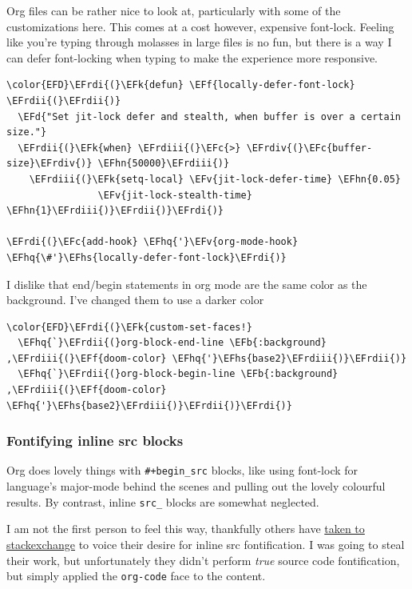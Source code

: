 \documentclass{scrartcl}
\newcommand{\EFk}[1]{\textcolor{EFk}{#1}} %
\newcommand{\EFd}[1]{\textcolor{EFd}{#1}} %
\newcommand{\EFb}[1]{\textcolor{EFb}{#1}} %
\newcommand{\EFc}[1]{\textcolor{EFc}{#1}} %
\newcommand{\EFv}[1]{\textcolor{EFv}{#1}} %
\newcommand{\EFf}[1]{\textcolor{EFf}{#1}} %
\newcommand{\EFhn}[1]{#1} %
\newcommand{\EFhq}[1]{#1} %
\newcommand{\EFhs}[1]{#1} %
\newcommand{\EFrdi}[1]{#1} %
\newcommand{\EFrdii}[1]{#1} %
\newcommand{\EFrdiii}[1]{#1} %
\newcommand{\EFrdiv}[1]{#1} %
\begin{document}
Org files can be rather nice to look at, particularly with some of the
customizations here. This comes at a cost however, expensive font-lock.
Feeling like you're typing through molasses in large files is no fun, but there
is a way I can defer font-locking when typing to make the experience more
responsive.
\begin{Code}
\begin{Verbatim}[]
\color{EFD}\EFrdi{(}\EFk{defun} \EFf{locally-defer-font-lock} \EFrdii{(}\EFrdii{)}
  \EFd{"Set jit-lock defer and stealth, when buffer is over a certain size."}
  \EFrdii{(}\EFk{when} \EFrdiii{(}\EFc{>} \EFrdiv{(}\EFc{buffer-size}\EFrdiv{)} \EFhn{50000}\EFrdiii{)}
    \EFrdiii{(}\EFk{setq-local} \EFv{jit-lock-defer-time} \EFhn{0.05}
                \EFv{jit-lock-stealth-time} \EFhn{1}\EFrdiii{)}\EFrdii{)}\EFrdi{)}

\EFrdi{(}\EFc{add-hook} \EFhq{'}\EFv{org-mode-hook} \EFhq{\#'}\EFhs{locally-defer-font-lock}\EFrdi{)}
\end{Verbatim}
\end{Code}

I dislike that end/begin statements in org mode are the same color as the
background. I've changed them to use a darker color
\begin{Code}
\begin{Verbatim}[]
\color{EFD}\EFrdi{(}\EFk{custom-set-faces!}
  \EFhq{`}\EFrdii{(}org-block-end-line \EFb{:background} ,\EFrdiii{(}\EFf{doom-color} \EFhq{'}\EFhs{base2}\EFrdiii{)}\EFrdii{)}
  \EFhq{`}\EFrdii{(}org-block-begin-line \EFb{:background} ,\EFrdiii{(}\EFf{doom-color} \EFhq{'}\EFhs{base2}\EFrdiii{)}\EFrdii{)}\EFrdi{)}
\end{Verbatim}
\end{Code}

\subsubsection{Fontifying inline src blocks}
\label{sec:orgbee075f}
Org does lovely things with \texttt{\#+begin\_src} blocks, like using font-lock for
language's major-mode behind the scenes and pulling out the lovely colourful
results. By contrast, inline \texttt{src\_} blocks are somewhat neglected.

I am not the first person to feel this way, thankfully others have \href{https://stackoverflow.com/questions/20309842/how-to-syntax-highlight-for-org-mode-inline-source-code-src-lang/28059832}{taken to
stackexchange} to voice their desire for inline src fontification. I was going to
steal their work, but unfortunately they didn't perform \emph{true} source code
fontification, but simply applied the \texttt{org-code} face to the content.
\end{document}
